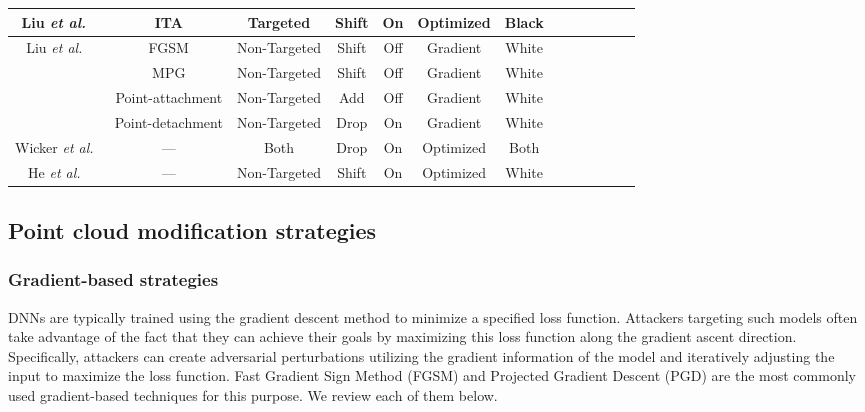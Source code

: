 \documentclass{ieeeaccess}
\def\etal{\textit{et al.}}
\begin{document}
\begin{table*}
\begin{tabular}{c c|ccccccccccc}
\hline
\multirow{1}{*}{Liu \etal~\cite{liu2022imperceptible}} & ITA & Targeted & Shift & On & Optimized & Black\\
\hline
\multirow{4}{*}{Liu \etal~\cite{yang2019adversarial}} & FGSM & Non-Targeted & Shift & Off & Gradient & White\\& MPG  & Non-Targeted & Shift & Off & Gradient & White\\ & Point-attachment & Non-Targeted & Add & Off & Gradient & White\\& Point-detachment & Non-Targeted & Drop & On & Gradient & White\\
\hline
\multirow{1}{*}{Wicker \etal~\cite{wicker2019robustness}} & --- & Both & Drop & On & Optimized & Both\\

\hline
\multirow{1}{*}{He \etal~\cite{he2023generating}} & --- & Non-Targeted & Shift & On & Optimized & White\\



\bottomrule

\end{tabular}
\end{table*}


\subsection{Point cloud modification strategies}
\label{subsubsec: generation Strategies}


\subsubsection{Gradient-based strategies}
\label{subsubsec:Gradient-based}

DNNs are typically trained using the gradient descent method to minimize a specified loss function. Attackers targeting such models often take advantage of the fact that they can achieve their goals by maximizing this loss function along the gradient ascent direction. Specifically, attackers can create adversarial perturbations utilizing the gradient information of the model and iteratively adjusting the input to maximize the loss function. 
Fast Gradient Sign Method (FGSM) and Projected Gradient Descent (PGD) are the most commonly used gradient-based techniques for this purpose. We review each of them below.
\end{document}
